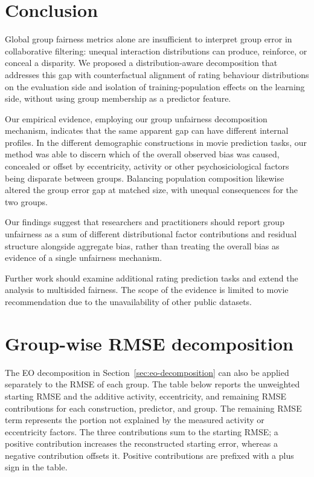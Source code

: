 \documentclass[11pt]{article}
\begin{document}
\section{Conclusion}
\label{sec:conclusion}

Global group fairness metrics alone are insufficient to interpret group error in collaborative
filtering: unequal interaction distributions can produce, reinforce, or
conceal a disparity. We proposed a distribution-aware decomposition that
addresses this gap with counterfactual alignment of rating behaviour distributions on the evaluation side and isolation of
training-population effects on the learning side, without using group
membership as a predictor feature.

Our empirical evidence, employing our group unfairness decomposition mechanism, indicates that the same apparent gap can have different
internal profiles. In the different demographic constructions in movie prediction tasks, our method was able to discern
which of the overall observed bias was caused, concealed or offset by eccentricity, activity or other psychosiciological factors being disparate between groups. Balancing population composition likewise altered the group error gap at
matched size, with unequal consequences for the two groups. 

Our findings suggest that researchers and practitioners should report group unfairness as a sum of different distributional factor contributions and residual structure
alongside aggregate bias, rather than treating the overall bias as evidence of a single unfairness
mechanism.


Further work should examine
additional rating prediction tasks and extend the analysis to multisided fairness. The scope of the evidence is limited to movie recommendation due to the unavailability of other public datasets.

\appendix
\section{Group-wise RMSE decomposition}
\label{sec:group-rmse-appendix}

The EO decomposition in Section~\ref{sec:eo-decomposition} can also be
applied separately to the RMSE of each group. The table below reports the
unweighted starting RMSE and the additive activity, eccentricity, and remaining
RMSE contributions for each construction, predictor, and group. The remaining
RMSE term represents the portion not explained by the measured activity or
eccentricity factors. The three contributions sum to the starting RMSE; a
positive contribution increases the reconstructed starting error, whereas a
negative contribution offsets it. Positive contributions are prefixed with a
plus sign in the table.





\end{document}
